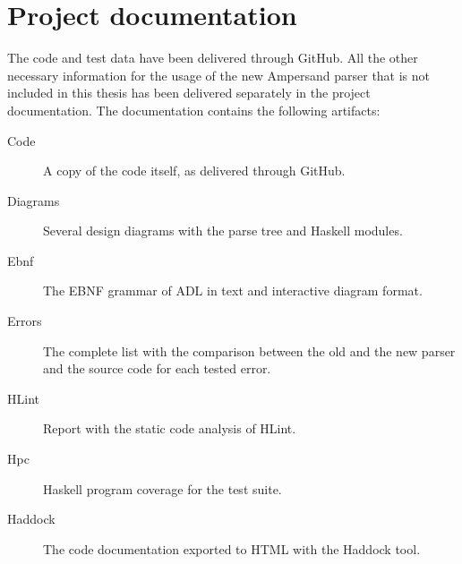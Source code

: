
\section*{Project documentation}
\label{app:docs}
The code and test data have been delivered through GitHub.
All the other necessary information for the usage of the new Ampersand parser that is not included in this thesis has been delivered separately in the project documentation.
The documentation contains the following artifacts:
\begin{description}
  \item [Code] A copy of the code itself, as delivered through GitHub.
  \item [Diagrams] Several design diagrams with the parse tree and Haskell modules.
  \item [Ebnf] The EBNF grammar of ADL in text and interactive diagram format.
  \item [Errors] The complete list with the comparison between the old and the new parser and the source code for each tested error.
  \item [HLint] Report with the static code analysis of HLint.
  \item [Hpc] Haskell program coverage for the test suite.
  \item [Haddock] The code documentation exported to HTML with the Haddock tool.
\end{description}
